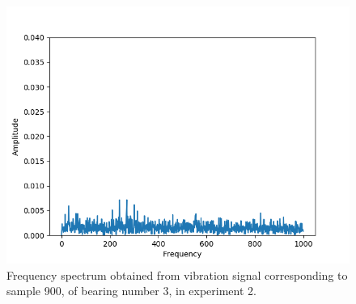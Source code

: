 \documentclass[../Main/thesis.tex]{subfiles}
\begin{document}
\begin{figure}[H] 
   \centering
   \includegraphics[width=6in]{../fig/experiment2_bearing3_fft.png} 
   \caption{Frequency spectrum obtained from vibration signal corresponding to sample 900, of bearing number 3, in experiment 2.}
   \label{fig:bearing3-experiment2-fft}
\end{figure}
\end{document}
